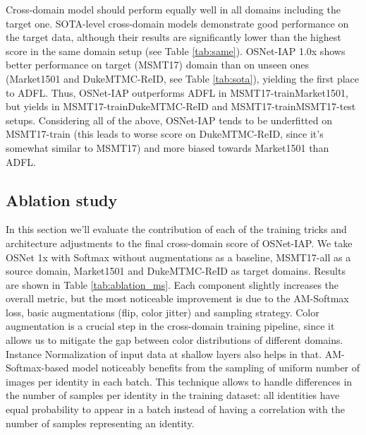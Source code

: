 \documentclass[a4paper,conference]{IEEEtran}
\begin{document}
Cross-domain model should perform equally well in all domains including the
target one. SOTA-level cross-domain models demonstrate good performance on the
target data, although their results are significantly lower than the highest
score in the same domain setup (see Table \ref{tab:same}).  OSNet-IAP 1.0x shows
better performance on target (MSMT17) domain than on unseen ones (Market1501 and
DukeMTMC-ReID, see Table \ref{tab:sota}), yielding the first place to
ADFL. Thus, OSNet-IAP outperforms ADFL in MSMT17-trainMarket1501,
but yields in MSMT17-trainDukeMTMC-ReID and
MSMT17-trainMSMT17-test setups.  Considering all of the above,
OSNet-IAP tends to be underfitted on MSMT17-train (this leads to worse score on
DukeMTMC-ReID, since it's somewhat similar to MSMT17) and more biased towards
Market1501 than ADFL.

\subsection{Ablation study}
\label{subsec:ablation}

In this section we'll evaluate the contribution of each of the training tricks
and architecture adjustments to the final cross-domain score of OSNet-IAP. We
take OSNet 1x with Softmax without augmentations as a baseline, MSMT17-all as a
source domain, Market1501 and DukeMTMC-ReID as target domains. Results are shown
in Table \ref{tab:ablation_ms}.  Each component slightly increases the overall
metric, but the most noticeable improvement is due to the AM-Softmax loss, basic
augmentations (flip, color jitter) and sampling strategy.  Color augmentation is
a crucial step in the cross-domain training pipeline, since it allows us to mitigate the gap
between color distributions of different domains. Instance Normalization of
input data at shallow layers also helps in that. AM-Softmax-based model
noticeably benefits from the sampling of uniform number of images per identity
in each batch.  This technique allows to handle differences in the number of
samples per identity in the training dataset: all identities have equal
probability to appear in a batch instead of having a correlation with the number
of samples representing an identity.
\end{document}
